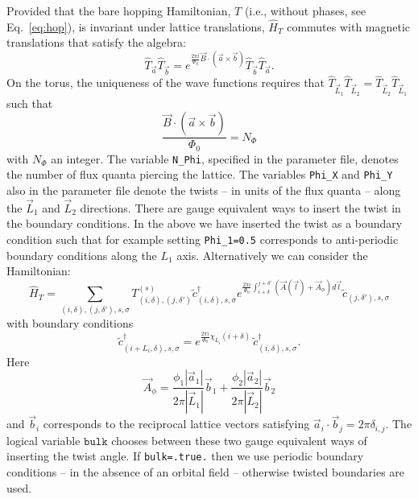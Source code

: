 Provided that the bare hopping Hamiltonian, $T$ (i.e., without phases, see Eq.~\eqref{eq:hop}), is invariant under lattice translations, $\hat{H}_T$ commutes with magnetic translations that satisfy the algebra:
\begin{equation}
\hat{T}_{\vec{a}} \hat{T}_{\vec{b}} =  e^{ \frac{2 \pi i}{\Phi_0}   \vec{B} \cdot \left( \vec{a} \times \vec{b} \right) }  \hat{T}_{\vec{b}} \hat{T}_{\vec{a}}. 
\end{equation}
On the  torus, the uniqueness of the wave functions requires that  $\hat{T}_{\vec{L}_1} \hat{T}_{\vec{L}_2}  =   \hat{T}_{\vec{L}_2} \hat{T}_{\vec{L}_1} $ such
that
\begin{equation}
\frac{\vec{B} \cdot \left( \vec{a} \times \vec{b}  \right) }{\Phi_0 } = N_{\Phi}   
\end{equation}
with  $N_\Phi $ an integer.  The variable \texttt{N\_Phi},   specified in the parameter file,   denotes the number of flux quanta piercing the lattice.    The variables \texttt{Phi\_X}  and   \texttt{Phi\_Y} also   in the parameter file denote  the twists  -- in units of the flux quanta  --  along the $\vec{L}_1$ and  $\vec{L}_2$ directions.     There are gauge  equivalent ways to insert the  twist in the boundary conditions. In the above we  have inserted the twist as a boundary condition such that for example setting \texttt{Phi\_1=0.5}  corresponds to anti-periodic boundary conditions along the $L_1$  axis.
Alternatively we can consider the Hamiltonian:
\begin{equation}
\hat{H}_T = \sum_{(i,\delta), (j,\delta'), s, \sigma}    T_{(i,\delta), (j,\delta')}^{(s)}    \tilde{c}^{\dagger}_{(i,\delta),s,\sigma }   e^{\frac{2 \pi i}{\Phi_0} \int_{i + \delta}^{j + \delta'} \left(  \vec{A}(\vec{l})  + \vec{A}_{\phi} \right)  d \vec{l}} \tilde{c}^{}_{(j,\delta'),s,\sigma }
\end{equation}
with boundary conditions 
\begin{equation}
\tilde{c}^{\dagger}_{(i + L_i,\delta) ,s,\sigma }   =  e^{\frac{2 \pi i }{\Phi_0} \chi_{L_i} ( i + \delta ) } \, \tilde{c}^{\dagger}_{(i,\delta) ,s,\sigma }.
\end{equation}
Here 
\begin{equation}
\vec{A}_{\phi} =\frac{  \phi_1  |\vec{a}_1|} { 2 \pi |\vec{L}_1| } \vec{b}_1 +  \frac{  \phi_2  |\vec{a}_2|}{2 \pi  |\vec{L}_2| } \vec{b}_2
\end{equation}
and $\vec{b}_i$  corresponds to the reciprocal lattice vectors satisfying  $ \vec{a}_i  \cdot  \vec{b}_j  = 2 \pi \delta_{i,j} $.   The logical variable $\texttt{bulk} $ chooses between these two  gauge equivalent ways  of inserting the twist angle. If \texttt{bulk=.true.} then  we use periodic boundary conditions  --  in the absence of an orbital field -- otherwise  twisted boundaries are used.  
